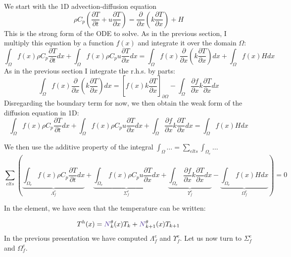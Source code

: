 
We start with the 1D advection-diffusion equation
\begin{equation}
\rho C_p \left( \frac{\partial T}{\partial t} 
+ u \frac{\partial T}{\partial x}
\right)
= \frac{\partial }{\partial x} \left( k \frac{\partial T}{\partial x}  \right)
+H
\end{equation}
This is the {\color{olive}strong form} of the ODE to solve.
As in the previous section, I multiply this equation by a function $f(x)$ and integrate it over 
the domain $\Omega$:
\[
\int_{\Omega} f(x)  \rho C_p\frac{\partial T}{\partial t} dx
+
\int_{\Omega} f(x)  \rho C_p u \frac{\partial T}{\partial x} dx
\!=\!
\int_{\Omega} f(x) \frac{\partial }{\partial x}\! \left(\! k\! \frac{\partial T}{\partial x}\!  \right)\! dx
+
\int_{\Omega} f(x) H dx 
\]
As in the previous section I integrate the r.h.s. by parts:
\[
\int_{\Omega} f(x) \frac{\partial }{\partial x} \left( k \frac{\partial T}{\partial x}  \right) dx
=
\left[
f(x) k \frac{\partial T}{\partial x}
\right]_{\partial \Omega}
-
\int_{\Omega} \frac{\partial f}{\partial x}  k \frac{\partial T}{\partial x}  dx
\]
Disregarding the boundary term for now, 
we then obtain the {\color{olive}weak form} of the diffusion equation in 1D:
\[
\boxed{
\int_{\Omega} f(x) \rho C_p \frac{\partial T}{\partial t} dx
+
\int_{\Omega} f(x)  \rho C_p u \frac{\partial T}{\partial x} dx
+
\int_{\Omega} \frac{\partial f}{\partial x}  k \frac{\partial T}{\partial x}  dx = 
\int_{\Omega} f(x) H dx 
}
\]

We then use the additive property of the integral $\int_\Omega \dots = \sum_{elts} \int_{\Omega_e} \dots$
\[
\sum_{elts} \left(     
\underbrace{ \int_{\Omega_e} f(x) \rho C_p   \frac{\partial T}{\partial t} dx }_{{\Lambda}_f^e}
+
\underbrace{  \int_{\Omega_e} f(x)  \rho C_p u \frac{\partial T}{\partial x} dx  }_{{\Sigma}_f^e}
+
\underbrace{\int_{\Omega_e} \frac{\partial f}{\partial x}  k \frac{\partial T}{\partial x}  dx}_{{\Upsilon}_f^e}    
- 
\underbrace{\int_{\Omega_e} f(x) H dx }_{{\Omega}_f^e}
  \right) = 0  
\]

In the element, we have seen that the temperature can be written:

\[
T^h(x) 
= {\color{Violet}N}^\theta_{k}(x) T_k + {\color{Violet}N}^\theta_{k+1}(x) T_{k+1}  
\]
In the previous presentation we have computed  ${\Lambda}_f^e$ and ${\Upsilon}_f^e$.
Let us now turn to ${\Sigma}_f^e$ and ${\Omega}_f^e$.

